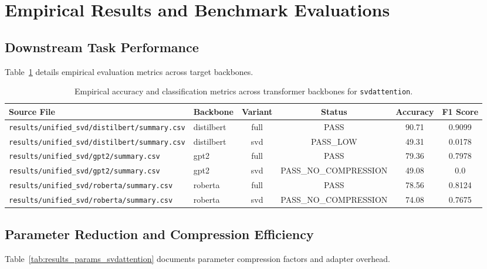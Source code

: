 \section{Empirical Results and Benchmark Evaluations}

\subsection{Downstream Task Performance}
Table~\ref{tab:results_acc_svdattention} details empirical evaluation metrics across target backbones.

\begin{table}[t]
\centering
\small
\begin{tabular}{llcccc}
\toprule
\textbf{Source File} & \textbf{Backbone} & \textbf{Variant} & \textbf{Status} & \textbf{Accuracy} & \textbf{F1 Score} \\
\midrule
\texttt{results/unified\_svd/distilbert/summary.csv} & distilbert & full & PASS & 90.71 & 0.9099 \\
\texttt{results/unified\_svd/distilbert/summary.csv} & distilbert & svd & PASS\_LOW & 49.31 & 0.0178 \\
\texttt{results/unified\_svd/gpt2/summary.csv} & gpt2 & full & PASS & 79.36 & 0.7978 \\
\texttt{results/unified\_svd/gpt2/summary.csv} & gpt2 & svd & PASS\_NO\_COMPRESSION & 49.08 & 0.0 \\
\texttt{results/unified\_svd/roberta/summary.csv} & roberta & full & PASS & 78.56 & 0.8124 \\
\texttt{results/unified\_svd/roberta/summary.csv} & roberta & svd & PASS\_NO\_COMPRESSION & 74.08 & 0.7675 \\
\bottomrule
\end{tabular}
\caption{Empirical accuracy and classification metrics across transformer backbones for \texttt{svdattention}.}
\label{tab:results_acc_svdattention}
\end{table}

\subsection{Parameter Reduction and Compression Efficiency}
Table~\ref{tab:results_params_svdattention} documents parameter compression factors and adapter overhead.

